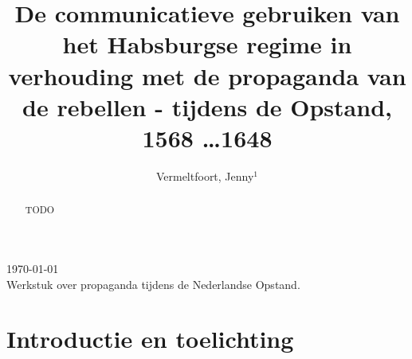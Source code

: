 \documentclass[11pt]{amsart}
\begin{document}
\setcounter{page}{1}

\hfill     {\small \today} \\
{\small Werkstuk over propaganda tijdens de Nederlandse Opstand.}\hfill
{\small } %

\centerline{}

\centerline{}

\title[Propaganda tijdens de Opstand]{De communicatieve gebruiken van het Habsburgse regime in
     verhouding met de propaganda van de rebellen - tijdens de Opstand,
     1568 \ldots 1648}

\author[J. Vermeltfoort]{Vermeltfoort, Jenny$^1$}

\address{$^{1}$ 3787494, Faculteit Geesteswetenschappen, Leiden
     Universiteit, Leiden, Nederland.}
\email{\textcolor[rgb]{0.00,0.00,0.84}{j.vermeltfoort@umail.leidenuniv.nl}}


\begin{abstract}
     TODO
\end{abstract}
\maketitle

\section{Introductie en toelichting}

% 


\end{document}
